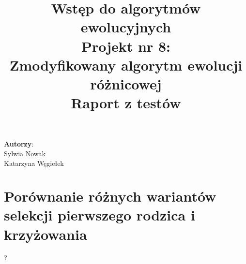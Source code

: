 \documentclass[a4paper,12pt]{article}
\title{Wstęp do algorytmów ewolucyjnych \\ Projekt nr 8: \\ \textbf{Zmodyfikowany algorytm ewolucji różnicowej}\\
Raport z testów}
\theoremstyle{definition}
\begin{document}
	\maketitle
	\vfill
	\begin{flushright}
		\textbf{Autorzy}:\\
		Sylwia Nowak\\Katarzyna Węgiełek\\
	\end{flushright}
	
	\newpage
	\tableofcontents
	\newpage
	

\section{Porównanie różnych wariantów selekcji pierwszego rodzica i krzyżowania}
?\\\\\\\\\\\\\\\\\\\\\\\\\\\\\\\\\\
\end{document}

